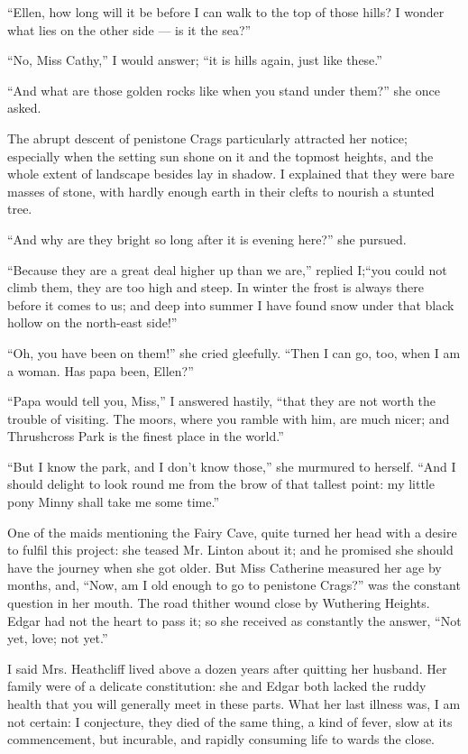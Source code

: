 \par “Ellen, how long will it be before I can walk to the top of those hills? I wonder what lies on the other side — is it the sea?”
\par “No, Miss Cathy,” I would answer; “it is hills again, just like these.”
\par “And what are those golden rocks like when you stand under them?” she once asked.
\par The abrupt descent of penistone Crags particularly attracted her notice; especially when the setting sun shone on it and the topmost heights, and the whole extent of landscape besides lay in shadow. I explained that they were bare masses of stone, with hardly enough earth in their clefts to nourish a stunted tree.
\par “And why are they bright so long after it is evening here?” she pursued.
\par “Because they are a great deal higher up than we are,” replied I;“you could not climb them, they are too high and steep. In winter the frost is always there before it comes to us; and deep into summer I have found snow under that black hollow on the north-east side!”
\par “Oh, you have been on them!” she cried gleefully. “Then I can go, too, when I am a woman. Has papa been, Ellen?”
\par “Papa would tell you, Miss,” I answered hastily, “that they are not worth the trouble of visiting. The moors, where you ramble with him, are much nicer; and Thrushcross Park is the finest place in the world.”
\par “But I know the park, and I don't know those,” she murmured to herself. “And I should delight to look round me from the brow of that tallest point: my little pony Minny shall take me some time.”
\par One of the maids mentioning the Fairy Cave, quite turned her head with a desire to fulfil this project: she teased Mr. Linton about it; and he promised she should have the journey when she got older. But Miss Catherine measured her age by months, and, “Now, am I old enough to go to penistone Crags?” was the constant question in her mouth. The road thither wound close by Wuthering Heights. Edgar had not the heart to pass it; so she received as constantly the answer, “Not yet, love; not yet.”
\par I said Mrs. Heathcliff lived above a dozen years after quitting her husband. Her family were of a delicate constitution: she and Edgar both lacked the ruddy health that you will generally meet in these parts. What her last illness was, I am not certain: I conjecture, they died of the same thing, a kind of fever, slow at its commencement, but incurable, and rapidly consuming life to wards the close.
